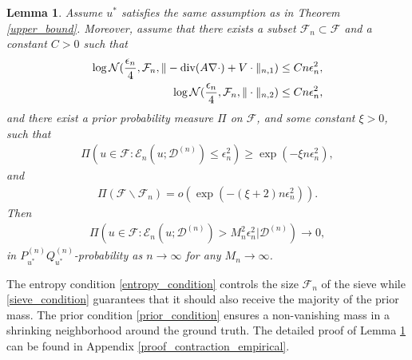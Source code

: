 \documentclass{article}
\newcommand{\F}{\mathcal{F}}
\newcommand{\N}{\mathcal{N}}
\newcommand{\D}{\mathcal{D}}
\renewcommand{\div}{\textnormal{div}}
\theoremstyle{plain}
\newtheorem{lemma}[theorem]{Lemma}
\theoremstyle{definition}
\theoremstyle{remark}
\begin{document}
\begin{lemma}  \label{contraction_empirical}
     Assume $u^*$ satisfies the same assumption as in Theorem \ref{upper_bound}. Moreover, assume that there exists a subset $\F_n \subset \F$ and a constant $C > 0$ such that
     \begin{align} \label{entropy_condition}
     \begin{split}
          \log \N(\frac{\epsilon_n}{4}, \F_n, \|-\div (A \nabla\cdot) + V \cdot \|_{n, 1}) \leq C n \epsilon_n^2, \\
          \log \N(\frac{\epsilon_n}{4}, \F_n, \|\cdot\|_{n, 2}) \leq C n \epsilon_n^2,
    \end{split}
     \end{align}
     and there exist a prior probability measure $\Pi$ on $\F$, and some constant $\xi > 0$, such that
     \begin{align} \label{prior_condition}
         \Pi(u \in \F: \mathcal{E}_n (u; \D^{(n)} ) \leq \epsilon_n^2) \geq \exp(-\xi n \epsilon_n^2), 
     \end{align}
     and
     \begin{align} \label{sieve_condition}
         \Pi(\F \backslash \F_n) = o(\exp(-(\xi+2)n \epsilon_n^2)). 
     \end{align}
     Then 
     \begin{align*}
         \Pi(u \in \F: \mathcal{E}_n(u; \D^{(n)} ) > M_n^2 \epsilon_n^2 | \D^{(n)}) \to 0,
     \end{align*}
     in $P_{u^*}^{(n)} Q_{u^*}^{(n)}$-probability as $n \to \infty$ for any $M_n \to \infty$. 
\end{lemma}
 The entropy condition \eqref{entropy_condition} controls the size $\F_n$ of the sieve while \eqref{sieve_condition} guarantees that it should also receive the majority of the prior mass. The prior condition \eqref{prior_condition} ensures a non-vanishing mass in a shrinking neighborhood around the ground truth. The detailed proof of Lemma \ref{contraction_empirical} can be found in Appendix \ref{proof_contraction_empirical}. 
\end{document}
